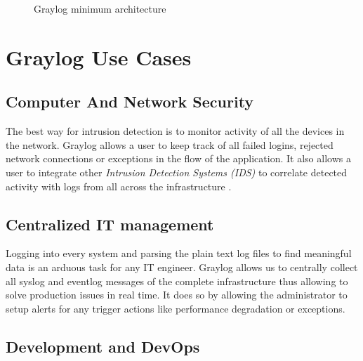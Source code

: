 \documentclass[9pt,twocolumn,twoside]{../../styles/osajnl}
\begin{document}
\begin{figure}[htbp]
\centering
{}
\caption{Graylog minimum architecture \cite{www-graylog-docs}}
\label{fig:Graylog Minimum Architecture}
\end{figure}

\section{Graylog Use Cases}

\subsection{Computer And Network Security}

The best way for intrusion detection is to monitor activity of all the
devices in the network.  Graylog allows a user to keep track of all
failed logins, rejected network connections or exceptions in the flow
of the application. It also allows a user to integrate other
\emph{Intrusion Detection Systems (IDS)} \cite{www-ids-wiki} to
correlate detected activity with logs from all across the
infrastructure \cite{www-graylog-org}.

\subsection{Centralized IT management}

Logging into every system and parsing the plain text log files to find
meaningful data is an arduous task for any IT engineer. Graylog allows
us to centrally collect all syslog and eventlog messages of the
complete infrastructure thus allowing to solve production issues in
real time. It does so by allowing the administrator to setup alerts
for any trigger actions like performance degradation or exceptions.

\subsection{Development and DevOps}
\end{document}
